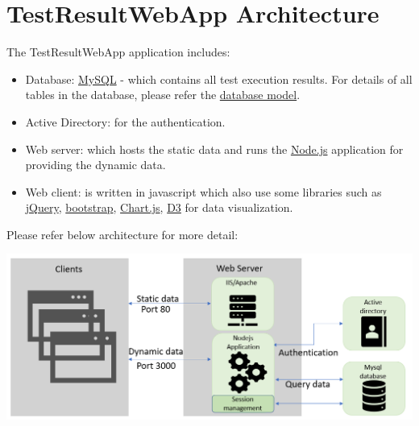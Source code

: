 



\hypertarget{webapp-architecture}{%
\section{TestResultWebApp Architecture}\label{webapp-architecture}}

The TestResultWebApp application includes:
\begin{itemize}
   \item Database: \href{https://mysql.com/}{MySQL} - which contains all test execution
         results. For details of all tables in the database, please refer the
         \href{https://github.com/test-fullautomation/testresultwebapp/blob/develop/TestResultWebApp/mysql_server/datamodel/datamodel.svg}{database
         model}.
   \item Active Directory: for the authentication.
   \item Web server: which hosts the static data and runs the \href{https://nodejs.org/}{Node.js}
         application for providing the dynamic data.
   \item Web client: is written in javascript which also use some libraries such
         as \href{https://jquery.com/}{jQuery}, \href{https://getbootstrap.com/docs/5.0/getting-started/introduction/}{bootstrap},
         \href{https://www.chartjs.org/}{Chart.js},
         \href{https://d3js.org/}{D3} for data visualization.
\end{itemize}

Please refer below architecture for more detail:

\includegraphics[width=1\linewidth]{./pictures/Architechture.png}

